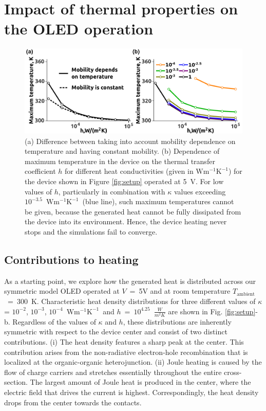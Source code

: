 \documentclass[%
9pt,
 aip,
rsi,%
 amsmath,amssymb,
preprint,%
]{revtex4-1}
\newcommand{\thermalconductivity}{$\mathrm{W m^{-1} K^{-1}}$}
\begin{document}
\section{Impact of thermal properties on the OLED operation}

\begin{figure}
	\centering
    \includegraphics[width=1\textwidth]{Fig_3.pdf} 
    \caption{(a) Difference between taking into account mobility dependence on temperature and having constant mobility. (b) Dependence of maximum temperature in the device on the thermal transfer coefficient $h$ for different heat conductivities (given in \thermalconductivity) for the device shown in Figure \ref{fig:setup} operated at 5~V. 
    For low values of $h$, particularly in combination with $\kappa$ values exceeding $10^{-3.5}$~\thermalconductivity~(blue line), such maximum temperatures cannot be given, because the generated heat cannot be fully dissipated from the device into its environment. Hence, the device heating never stops and the simulations fail to converge.}
\label{fig:I-Vandh-k-maxT}
\end{figure}

\subsection{Contributions to heating}
As a starting point, we explore how the generated heat is distributed across our symmetric model OLED operated at $V$~=~5V and at room temperature $T_{\mathrm{ambient}}$~=~300~K. 
Characteristic heat density distributions for three different values of $\kappa$ = $10^{-2}$, $10^{-3}$, $10^{-4}$~\thermalconductivity~and $h$~=~$10^{4.25}$~$\frac{W}{m^2 K}$ are shown in Fig. \ref{fig:setup}-b.
Regardless of the values of $\kappa$ and $h$, these distributions are inherently symmetric with respect to the device center and consist of two distinct contributions. 
(i) The heat density features a sharp peak at the center. 
This contribution arises from the non-radiative electron-hole recombination that is localized at the organic-organic heterojunction. 
(ii) Joule heating is caused by the flow of charge carriers and stretches essentially throughout the entire cross-section. 
The largest amount of Joule heat is produced in the center, where the electric field that drives the current is highest. 
Correspondingly, the heat density drops from the center towards the contacts. 
\end{document}
